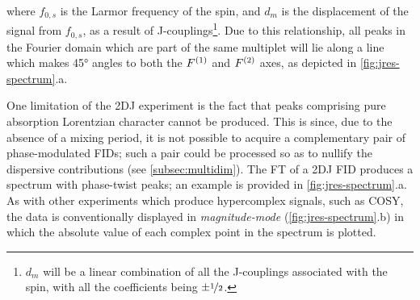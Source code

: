 where $f_{0,s}$ is the Larmor frequency of
the spin, and $d_m$ is the displacement
of the signal from $f_{0,s}$, as a result of J-couplings\footnote{
    $d_m$ will be a linear combination of all the J-couplings
    associated with the spin, with all the coefficients being $\pm
    \nicefrac{1}{2}$.
}. Due to this relationship, all peaks in the Fourier domain which are part of
the same multiplet will lie along a line which makes \ang{45} angles to both
the $F^{(1)}$ and $F^{(2)}$ axes, as depicted in \cref{fig:jres-spectrum}.a.

One limitation of the \ac{2DJ} experiment is the fact that peaks comprising
pure absorption Lorentzian character cannot be produced. This is since, due
to the absence of a mixing period, it is not possible to acquire a
complementary pair of phase-modulated \acp{FID}; such a pair could be processed
so as to nullify the dispersive contributions (see \cref{subsec:multidim}).
The FT of a \ac{2DJ} \ac{FID} produces a spectrum with phase-twist
peaks; an example is provided in \cref{fig:jres-spectrum}.a. As with
other experiments which produce hypercomplex signals, such as \ac{COSY}, the
data is conventionally displayed in \emph{magnitude-mode}
(\cref{fig:jres-spectrum}.b) in which the absolute value of each complex point
in the spectrum is plotted.

